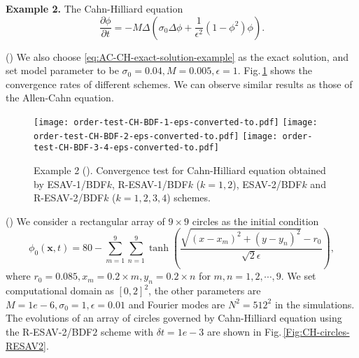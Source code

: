 \documentclass[final,review,onefignum,onetabnum]{siamart190516}
\theoremstyle{plain}
\begin{document}
\textbf{Example 2.} The Cahn-Hilliard equation
\begin{equation}
\frac{\partial \phi}{\partial t}=-M \Delta\left(\sigma_0 \Delta \phi+\frac{1}{\epsilon^2}\left(1-\phi^{2}\right) \phi\right).
\end{equation}

()
We also choose \eqref{eq:AC-CH-exact-solution-example} as the exact solution, and
set model parameter to be $\sigma_0=0.04, M=0.005, \epsilon=1$. 
Fig.\,\ref{Fig:CH-order-test-three-method} shows the convergence rates of different schemes. 
We can observe similar results as those of the Allen-Cahn equation. 

\begin{figure}[htbp]
	\centering
	\texttt{[image: order-test-CH-BDF-1-eps-converted-to.pdf]}\hspace{-6mm}
	\texttt{[image: order-test-CH-BDF-2-eps-converted-to.pdf]}\hspace{-6mm}
	\texttt{[image: order-test-CH-BDF-3-4-eps-converted-to.pdf]}
	\caption{Example 2 (). Convergence test for Cahn-Hilliard equation obtained by ESAV-1/BDF$k$, R-ESAV-1/BDF$k$ ($k=1, 2$), ESAV-2/BDF$k$ and R-ESAV-2/BDF$k$ ($k=1, 2, 3, 4$) schemes.}
	\label{Fig:CH-order-test-three-method}
\end{figure} 

()  We consider a rectangular array of $9 \times  9$ circles as  the initial condition
\begin{equation}
\phi_{0}(\boldsymbol{x}, t)=80-\sum_{m=1}^{9} \sum_{n=1}^{9} \tanh\left(\frac{\sqrt{\left(x-x_{m}\right)^{2}+\left(y-y_{n}\right)^{2}}-r_{0}}{\sqrt{2} \epsilon}\right),
\end{equation}
where $r_0 = 0.085, x_{m} = 0.2\times m, y_{n} = 0.2\times n$ for $m, n = 1, 2, \cdots, 9$. 
We set computational domain as $[0, 2]^2$, the other parameters are $M=1e-6, \sigma_0=1, \epsilon=0.01$ and Fourier modes are $N^2=512^2$  in the simulations. 
The evolutions of an array of circles governed by Cahn-Hilliard equation using the R-ESAV-2/BDF$2$ scheme with $\delta t =1e-3$ are shown in Fig.\,\ref{Fig:CH-circles-RESAV2}.
\end{document}
